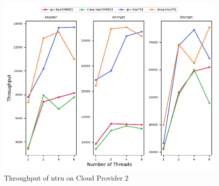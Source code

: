 \begin{figure}
    \centering
    \includegraphics[scale=0.75]{chapters/results/throughput/Cloud Provider 2_ntru.pdf}
    \caption{Throughput of \gls{ntru} on Cloud Provider 2}
    \label{figure:results:throughput:ntru:cloud-provider-2}
\end{figure}







